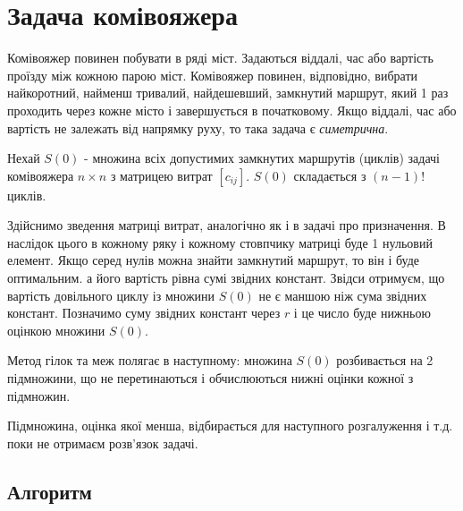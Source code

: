 \documentclass[12pt,a4paper]{book}
\begin{document}
\section{Задача комівояжера}

Комівояжер повинен побувати в ряді міст. Задаються віддалі, час або вартість проїзду між кожною парою міст. Комівояжер повинен, відповідно, вибрати найкоротний, найменш тривалий, найдешевший, замкнутий маршрут, який 1 раз проходить через кожне місто і завершується в початковому. Якщо віддалі, час або вартість не залежать від напрямку руху, то така задача є \emph{симетрична}.

Нехай $S(0)$ - множина всіх допустимих замкнутих маршрутів (циклів) задачі комівояжера $n \times n$ з матрицею витрат $[c_{ij}]$. $S(0)$ складається з $(n-1)!$ циклів.

Здійснимо зведення матриці витрат, аналогічно як і в задачі про призначення. В наслідок цього в кожному ряку і кожному стовпчику матриці буде 1 нульовий елемент. Якщо серед нулів можна знайти замкнутий маршрут, то він і буде оптимальним. а його вартість рівна сумі звідних констант. Звідси отримуєм, що вартість довільного циклу із множини $S(0)$ не є маншою ніж сума звідних констант. Позначимо суму звідних констант через $r$ і це число буде нижньою оцінкою множини $S(0)$.

Метод гілок та меж полягає в наступному: множина $S(0)$ розбивається на 2 підмножини, що не перетинаються і обчислюються нижні оцінки кожної з підмножин.

Підмножина, оцінка якої менша, відбирається для наступного розгалуження і т.д. поки не отримаєм розв’язок задачі.

\subsection{Алгоритм}
\end{document}
